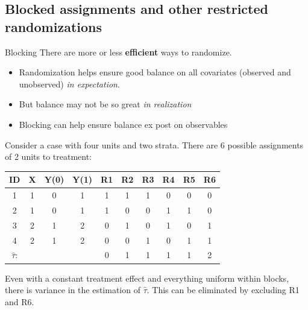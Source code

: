 \documentclass[
  11pt,
  ignorenonframetext,
]{beamer}
\providecommand{\tightlist}{%
  \setlength{\itemsep}{0pt}\setlength{\parskip}{0pt}}\usepackage{longtable,booktabs,array}
\begin{document}
\hypertarget{blocked-assignments-and-other-restricted-randomizations}{%
\subsection{\texorpdfstring{Blocked assignments and other restricted
randomizations
\label{blocked}}{Blocked assignments and other restricted randomizations }}\label{blocked-assignments-and-other-restricted-randomizations}}

\begin{frame}{Blocking}
\protect\hypertarget{blocking}{}
There are more or less \textbf{efficient} ways to randomize.

\begin{itemize}
\tightlist
\item
  Randomization helps ensure good balance on all covariates (observed
  and unobserved) \textit{in expectation}.\\
\item
  But balance may not be so great \textit{in realization}
\item
  Blocking can help ensure balance ex post on observables
\end{itemize}

Consider a case with four units and two strata. There are 6 possible
assignments of 2 units to treatment:

\begin{table} \scriptsize
    \centering
        \begin{tabular}{cccc|cccccc} 
        ID  &   X   &   Y(0)    &   Y(1)    &   R1  &   R2  &   R3  &   R4  &   R5  &   R6  \\ \hline
        1   &   1   &   0   &   1   &   1   &   1   &   1   &   0   &   0   &   0   \\
        2   &   1   &   0   &   1   &   1   &   0   &   0   &   1   &   1   &   0   \\ \hline
        3   &   2   &   1   &   2   &   0   &   1   &   0   &   1   &   0   &   1   \\
        4   &   2   &   1   &   2   &   0   &   0   &   1   &   0   &   1   &   1   \\ \hline \hline
        $\widehat{\tau}$:   &       &       &       &   0   &   1   &   1   &   1   &   1   &   2   \\
        \end{tabular}
\end{table}

Even with a constant treatment effect and everything uniform within
blocks, there is variance in the estimation of \(\widehat{\tau}\). This
can be eliminated by excluding R1 and R6.
\end{frame}
\end{document}
